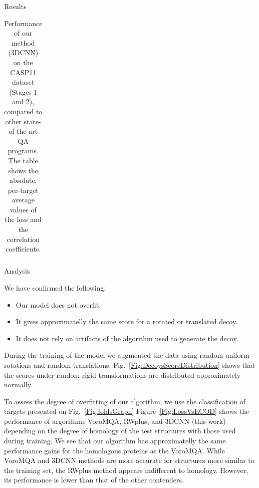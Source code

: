 \documentclass[final, unknownkeysallowed]{beamer}
\begin{document}
\begin{frame}{}
\begin{textblock}{39.0}
\begin{block}{Results}
\begin{table}[H]
\begin{center}
\begin{tabular}{ c | c | c | c | c }
\end{tabular}
\vspace{0.25cm}    
    \captionsetup{width=0.8\linewidth}
    \caption {Performance of our method (3DCNN) on the CASP11 dataset
      (Stages 1 and 2), compared to other state-of-the-art QA
      programs. The table shows the absolute, per-target average
      values of the loss and the correlation coefficients.}
    \label{Tbl:TestResults}
\end{center}
\end{table}

\end{block}

\begin{block}{Analysis}

We have confirmed the following:
\begin{itemize}
\item Our model does not overfit.
\item It gives approximatelly the same score for a rotated or
  translated decoy.
\item It does not rely on artifacts of the algorithm used to generate
  the decoy.
\end{itemize}

\vspace{0.5cm}
During the training of the model we augmented the data using random
uniform rotations and random
translations. Fig.~\ref{Fig:DecoysScoreDistribution} shows that the
scores under random rigid transformations are distributed
approximately normally.

\vspace{0.5cm}
To assess the degree of overfitting of our algorithm, we use the
classification of targets presented on Fig.~\ref{Fig:foldsGraph}
Figure~\ref{Fig:LossVsECOD} shows the performance of argorithms
VoroMQA, RWplus, and 3DCNN (this work) depending on the degree of
homology of the test structures with those used during training.  We
see that our algorithm has approximatelly the same performance gains
for the homologous proteins as the VoroMQA.
%
%
While VoroMQA and 3DCNN methods are more accurate for structures more
similar to the training set, the RWplus method appears indifferent to
homology. However, its performance is lower than that of the other
contenders.


\end{block}
\end{textblock}
\end{frame}
\end{document}
